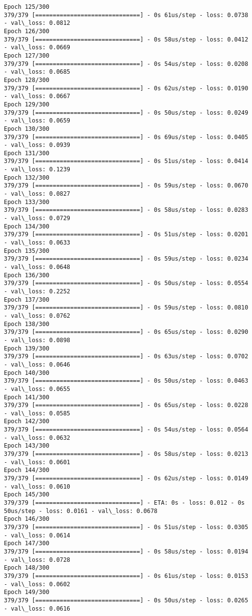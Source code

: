 \documentclass[11pt]{article}
\begin{document}
\begin{Verbatim}[commandchars=\\\{\}]
Epoch 125/300
379/379 [==============================] - 0s 61us/step - loss: 0.0738 - val\_loss: 0.0812
Epoch 126/300
379/379 [==============================] - 0s 58us/step - loss: 0.0412 - val\_loss: 0.0669
Epoch 127/300
379/379 [==============================] - 0s 54us/step - loss: 0.0208 - val\_loss: 0.0685
Epoch 128/300
379/379 [==============================] - 0s 62us/step - loss: 0.0190 - val\_loss: 0.0667
Epoch 129/300
379/379 [==============================] - 0s 50us/step - loss: 0.0249 - val\_loss: 0.0659
Epoch 130/300
379/379 [==============================] - 0s 69us/step - loss: 0.0405 - val\_loss: 0.0939
Epoch 131/300
379/379 [==============================] - 0s 51us/step - loss: 0.0414 - val\_loss: 0.1239
Epoch 132/300
379/379 [==============================] - 0s 59us/step - loss: 0.0670 - val\_loss: 0.0827
Epoch 133/300
379/379 [==============================] - 0s 58us/step - loss: 0.0283 - val\_loss: 0.0729
Epoch 134/300
379/379 [==============================] - 0s 51us/step - loss: 0.0201 - val\_loss: 0.0633
Epoch 135/300
379/379 [==============================] - 0s 59us/step - loss: 0.0234 - val\_loss: 0.0648
Epoch 136/300
379/379 [==============================] - 0s 50us/step - loss: 0.0554 - val\_loss: 0.2252
Epoch 137/300
379/379 [==============================] - 0s 59us/step - loss: 0.0810 - val\_loss: 0.0762
Epoch 138/300
379/379 [==============================] - 0s 65us/step - loss: 0.0290 - val\_loss: 0.0898
Epoch 139/300
379/379 [==============================] - 0s 63us/step - loss: 0.0702 - val\_loss: 0.0646
Epoch 140/300
379/379 [==============================] - 0s 50us/step - loss: 0.0463 - val\_loss: 0.0655
Epoch 141/300
379/379 [==============================] - 0s 65us/step - loss: 0.0228 - val\_loss: 0.0585
Epoch 142/300
379/379 [==============================] - 0s 54us/step - loss: 0.0564 - val\_loss: 0.0632
Epoch 143/300
379/379 [==============================] - 0s 58us/step - loss: 0.0213 - val\_loss: 0.0601
Epoch 144/300
379/379 [==============================] - 0s 62us/step - loss: 0.0149 - val\_loss: 0.0610
Epoch 145/300
379/379 [==============================] - ETA: 0s - loss: 0.012 - 0s 50us/step - loss: 0.0161 - val\_loss: 0.0678
Epoch 146/300
379/379 [==============================] - 0s 51us/step - loss: 0.0305 - val\_loss: 0.0614
Epoch 147/300
379/379 [==============================] - 0s 58us/step - loss: 0.0194 - val\_loss: 0.0728
Epoch 148/300
379/379 [==============================] - 0s 61us/step - loss: 0.0153 - val\_loss: 0.0602
Epoch 149/300
379/379 [==============================] - 0s 50us/step - loss: 0.0265 - val\_loss: 0.0616

\end{Verbatim}
\end{document}

